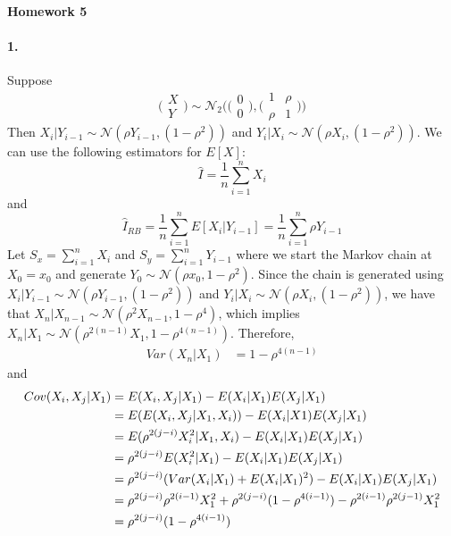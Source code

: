 \documentclass[12pt, leqno]{article}
\providecommand{\normd}{\mathcal{N}} %
\begin{document}
\pagestyle{fancy}

\begin{center}
{\large {\bf Homework 5}} \\
\end{center}
\paragraph{1.}Suppose 
\[
\bigg( \begin{matrix} X \\ Y \end{matrix}\bigg)  \sim \normd_2 \Bigg( \bigg(\begin{matrix} 0 \\
  0 \end{matrix}\bigg) , \bigg(\begin{matrix} 1 & \rho \\ \rho &
  1 \end{matrix}\bigg)\Bigg) 
\]
Then $X_i|Y_{i-1} \sim \normd(\rho Y_{i-1}, (1-\rho ^2))$ 
and $Y_i|X_i \sim \normd (\rho X_i, (1-\rho ^2))$. We can use the following estimators for $E[X]$:
\[
\hat{I} = \frac{1}{n} \sum_{i=1}^n X_i
\]
and 
\[
\hat{I}_{RB} = \frac{1}{n} \sum_{i=1}^n E[X_i|Y_{i-1}] = \frac{1}{n}
\sum_{i=1}^n \rho Y_{i-1}
\]
Let $S_x = \sum_{i=1}^n X_i$ and $S_y = \sum_{i=1}^n Y_{i-1}$ where we
start the Markov chain at $X_0 = x_0$ and generate $Y_0 \sim \normd
(\rho x_0,1- \rho^2)$. Since the chain is generated using $X_i|Y_{i-1}
\sim \normd(\rho Y_{i-1}, (1-\rho ^2))$ and $Y_i|X_i \sim \normd (\rho
X_i, (1-\rho ^2))$, we have that $X_n|X_{n-1}
\sim \normd (\rho^2X_{n-1},1- \rho^4)$, which implies $X_n|X_1 \sim
\normd(\rho^{2(n-1)}X_1,1-\rho^{4(n-1)})$. Therefore,
\begin{align} 
Var(X_n|X_1) &=1-\rho^{4(n-1)} \label{varx}
\end{align}
and 
\begin{align}
Cov(X_i,X_j|X_1) &= E(X_i,X_j|X_1) - E(X_i|X_1)E(X_j|X_1) \notag \\
&= E(E(X_i,X_j|X_1,X_i)) - E(X_i|X1)E(X_j|X_1) \notag \\
&= E(\rho^{2(j-i)}X_i^2|X_1,X_i) - E(X_i|X_1)E(X_j|X_1) \notag \\
&= \rho^{2(j-i)}E(X_i^2|X_1) - E(X_i|X_1)E(X_j|X_1) \notag \\
&= \rho^{2(j-i)}(Var(X_i|X_1)+E(X_i|X_1)^2) - E(X_i|X_1)E(X_j|X_1)
\notag \\
&= \rho^{2(j-i)}\rho^{2(i-1)}X_1^2+\rho^{2(j-i)}(1-\rho^{4(i-1)}) -
\rho^{2(i-1)}\rho^{2(j-1)}X_1^2 \notag \\
&= \rho^{2(j-i)}(1-\rho^{4(i-1)}) \label{covx}
\end{align}
\end{document}
